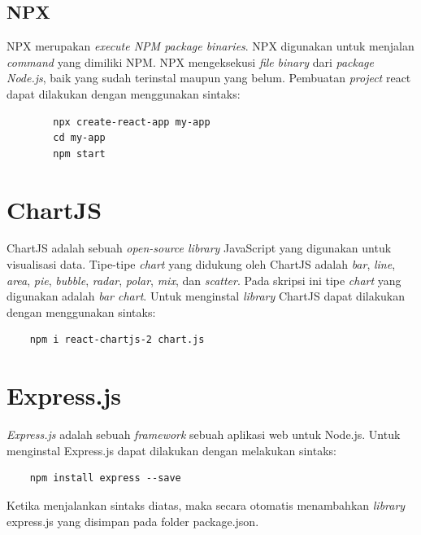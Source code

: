 \subsection{NPX}
NPX merupakan \textit{execute NPM package binaries}. NPX digunakan untuk menjalan \textit{command} yang dimiliki NPM. NPX mengeksekusi \textit{file} \textit{binary} dari \textit{package} \textit{Node.js}, baik yang sudah terinstal maupun yang belum. Pembuatan \textit{project} react dapat dilakukan dengan menggunakan sintaks:
    \begin{verbatim}
        npx create-react-app my-app
        cd my-app
        npm start
    \end{verbatim}

\section{ChartJS}
ChartJS adalah sebuah \textit{open-source library} JavaScript yang digunakan untuk visualisasi data. Tipe-tipe \textit{chart} yang didukung oleh ChartJS adalah \textit{bar}, \textit{line}, \textit{area}, \textit{pie}, \textit{bubble}, \textit{radar}, \textit{polar}, \textit{mix}, dan \textit{scatter}. Pada skripsi ini tipe \textit{chart} yang digunakan adalah \textit{bar chart}. Untuk menginstal \textit{library} ChartJS dapat dilakukan dengan menggunakan sintaks:
\begin{verbatim}
	npm i react-chartjs-2 chart.js
\end{verbatim}


\section{Express.js}
\textit{Express.js} adalah sebuah \textit{framework} sebuah aplikasi web untuk Node.js. Untuk menginstal Express.js dapat dilakukan dengan melakukan sintaks:
\begin{verbatim}
	npm install express --save
\end{verbatim}
Ketika menjalankan sintaks diatas, maka secara otomatis menambahkan \textit{library} express.js yang disimpan pada folder package.json.
